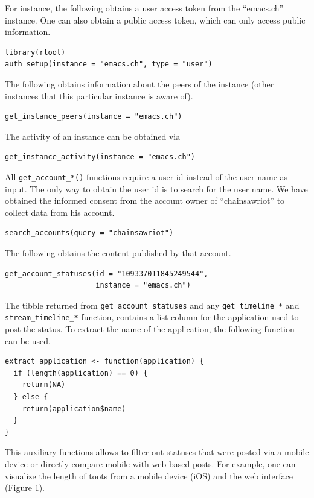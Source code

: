\documentclass[Royal,times,sageh]{sagej}
\begin{document}
For instance, the following obtains a user access token from the
``emacs.ch'' instance. One can also obtain a public access token, which
can only access public information.

\begin{verbatim}
library(rtoot)
auth_setup(instance = "emacs.ch", type = "user")
\end{verbatim}

The following obtains information about the peers of the instance (other
instances that this particular instance is aware of).

\begin{verbatim}
get_instance_peers(instance = "emacs.ch")
\end{verbatim}

The activity of an instance can be obtained via

\begin{verbatim}
get_instance_activity(instance = "emacs.ch")
\end{verbatim}

All \texttt{get\_account\_*()} functions require a user id instead of
the user name as input. The only way to obtain the user id is to search
for the user name. We have obtained the informed consent from the
account owner of ``chainsawriot'' to collect data from his account.

\begin{verbatim}
search_accounts(query = "chainsawriot")
\end{verbatim}

The following obtains the content published by that account.

\begin{verbatim}
get_account_statuses(id = "109337011845249544",
                     instance = "emacs.ch")
\end{verbatim}

The tibble returned from \texttt{get\_account\_statuses} and any
\texttt{get\_timeline\_*} and \texttt{stream\_timeline\_*} function,
contains a list-column for the application used to post the status. To
extract the name of the application, the following function can be used.

\begin{verbatim}
extract_application <- function(application) {
  if (length(application) == 0) {
    return(NA)
  } else {
    return(application$name)
  }
}
\end{verbatim}

This auxiliary functions allows to filter out statuses that were posted
via a mobile device or directly compare mobile with web-based posts. For
example, one can visualize the length of toots from a mobile device
(iOS) and the web interface (Figure 1).
\end{document}
